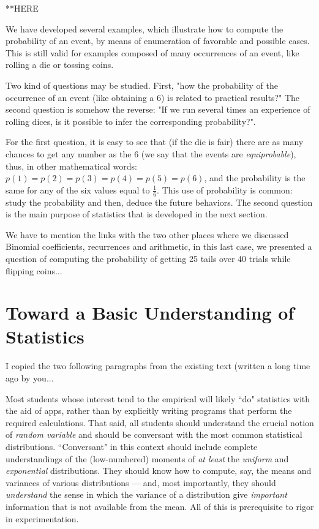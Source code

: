 \bigskip



**HERE

We have developed several examples, which illustrate how to compute the probability of an event,
by means of enumeration of favorable and possible cases. 
This is still valid for examples composed of many occurrences of an event,
like rolling a die or tossing coins. 

Two kind of questions may be studied.
First, "how the probability of the occurrence of an event (like obtaining a $6$) is related to practical results?"
The second question is somehow the reverse: "If we run several times an experience of rolling dices, is it possible 
to infer the corresponding probability?".

For the first question, it is easy to see that (if the die is fair) there are as many chances to get any number as the $6$
(we say that the events are \textit{equiprobable}),
thus, in other mathematical words: $p(1)=p(2)=p(3)=p(4)=p(5)=p(6)$,
and the probability is the same for any of the six values equal to $\frac{1}{6}$.
This use of probability is common: study the probability and then, deduce the future behaviors.
The second question is the main purpose of statistics that is developed in the next section.


{\Denis We have to mention the links with the two other places where we discussed Binomial coefficients, recurrences and arithmetic, in this last case, we presented a question of computing the probability of getting 25 tails over 40 trials while flipping coins...}



\section{Toward a Basic Understanding of Statistics}
\label{sec:statistics}


{\Denis I copied the two following paragraphs from the existing text (written a long time ago by you...}

Most students whose interest tend to the empirical will likely ``do"
statistics with the aid of apps, rather than by explicitly writing
programs that perform the required calculations.  That said, all
students should understand the crucial notion of {\em random variable}
and should be conversant with the most common statistical
distributions.  ``Conversant" in this context should include complete
understandings of the (low-numbered) moments of {\em at least} the
{\em uniform} and {\em exponential} distributions.  They should know
how to compute, say, the means and variances of various distributions
— and, most importantly, they should {\em understand} the sense in
which the variance of a distribution give {\em important} information
that is not available from the mean.  All of this is prerequisite to
rigor in experimentation.

